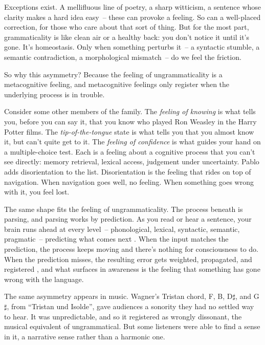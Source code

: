 Exceptions exist. A mellifluous line of poetry, a sharp witticism, a sentence whose clarity makes a hard idea easy~-- these can provoke a feeling. So can a well-placed correction, for those who care about that sort of thing. But for the most part, grammaticality is like clean air or a healthy back: you don't notice it until it's gone. It's homeostasis. Only when something perturbs it~-- a syntactic stumble, a semantic contradiction, a morphological mismatch~-- do we feel the friction.

So why this asymmetry? Because the feeling of ungrammaticality is a metacognitive feeling, and metacognitive feelings only register when the underlying process is in trouble.

Consider some other members of the family. The \emph{feeling of knowing} is what tells you, before you can say it, that you know who played Ron Weasley in the Harry Potter films. The \emph{tip-of-the-tongue} state is what tells you that you almost know it, but can't quite get to it. The \emph{feeling of confidence} is what guides your hand on a multiple-choice test. Each is a feeling about a cognitive process that you can't see directly: memory retrieval, lexical access, judgement under uncertainty. Pablo \textcite{FernandezVelasco2021} adds disorientation to the list. Disorientation is the feeling that rides on top of navigation. When navigation goes well, no feeling. When something goes wrong with it, you feel lost.

The same shape fits the feeling of ungrammaticality. The process beneath is parsing, and parsing works by prediction. As you read or hear a sentence, your brain runs ahead at every level~-- phonological, lexical, syntactic, semantic, pragmatic~-- predicting what comes next \citep{Clark2013,Kuperberg2016}. When the input matches the prediction, the process keeps moving and there's nothing for consciousness to do. When the prediction misses, the resulting error gets weighted, propagated, and registered \citep{Rabovsky2018}, and what surfaces in awareness is the feeling that something has gone wrong with the language.

\bigskip

The same asymmetry appears in music. Wagner's Tristan chord, F, B,
D\(\sharp\), and G\(\sharp\), from \enquote{Tristan und Isolde}, gave
audiences a sonority they had no settled way to hear. It was
unpredictable, and so it registered as wrongly dissonant, the musical
equivalent of ungrammatical. But some listeners were able to find a
sense in it, a narrative sense rather than a harmonic one.

